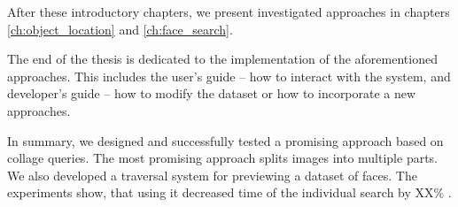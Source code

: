 After these introductory chapters, we present investigated approaches in chapters \ref{ch:object_location} and \ref{ch:face_search}. 

The end of the thesis is dedicated to the implementation of the aforementioned approaches. This includes the user's guide -- how to interact with the system, and developer's guide -- how to modify the dataset or how to incorporate a new approaches.

\bigskip

In summary, we designed and successfully tested a promising approach based on collage queries. The most promising approach splits images into multiple parts. We also developed a traversal system for previewing a dataset of faces. The experiments show, that using it decreased time of the individual search by XX\% \todo{}.
